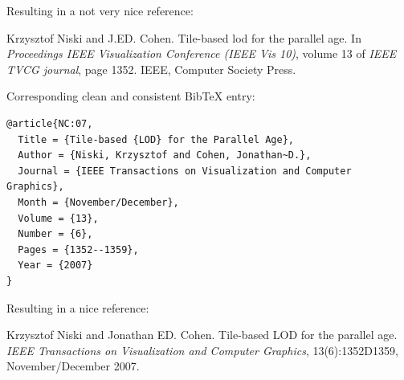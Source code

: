 \documentclass[11pt, a4paper,oneside,chapterprefix=false]{scrbook}
\begin{document}
\noindent
Resulting in a not very nice reference:

\smallskip
\noindent
[NC]  Krzysztof Niski and J.ED. Cohen. Tile-based lod for the parallel age. In {\em Proceedings IEEE Visualization Conference (IEEE Vis 10)}, volume 13 of {\em IEEE TVCG journal}, page 1352. IEEE, Computer Society Press.

\bigskip
\noindent
Corresponding clean and consistent BibTeX entry:

\begin{verbatim}
@article{NC:07,
  Title = {Tile-based {LOD} for the Parallel Age},
  Author = {Niski, Krzysztof and Cohen, Jonathan~D.},
  Journal = {IEEE Transactions on Visualization and Computer Graphics},
  Month = {November/December},
  Volume = {13},
  Number = {6},
  Pages = {1352--1359},
  Year = {2007}
}
\end{verbatim}

\noindent
Resulting in a nice reference:

\smallskip
\noindent
[NC07]  Krzysztof Niski and Jonathan ED. Cohen. Tile-based LOD for the parallel age. {\em IEEE Transactions on Visualization and Computer Graphics}, 13(6):1352D1359, November/December 2007.


%



\end{document}
